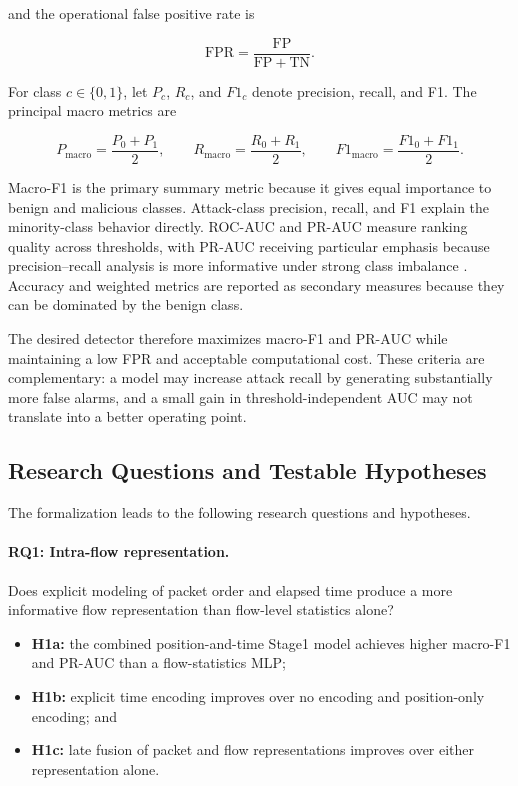 and the operational false positive rate is

\begin{equation}
\mathrm{FPR}
=
\frac{\mathrm{FP}}{\mathrm{FP}+\mathrm{TN}}.
\label{eq:fpr}
\end{equation}

For class $c\in\{0,1\}$, let $P_c$, $R_c$, and $F1_c$ denote precision,
recall, and F1. The principal macro metrics are

\begin{equation}
P_{\mathrm{macro}}=\frac{P_0+P_1}{2},
\qquad
R_{\mathrm{macro}}=\frac{R_0+R_1}{2},
\qquad
F1_{\mathrm{macro}}=\frac{F1_0+F1_1}{2}.
\label{eq:macro_metrics}
\end{equation}

Macro-F1 is the primary summary metric because it gives equal importance to
benign and malicious classes. Attack-class precision, recall, and F1 explain
the minority-class behavior directly. ROC-AUC and PR-AUC measure ranking
quality across thresholds, with PR-AUC receiving particular emphasis because
precision--recall analysis is more informative under strong class imbalance
\cite{SaitoRehmsmeier2015}. Accuracy and weighted metrics are reported as
secondary measures because they can be dominated by the benign class.

The desired detector therefore maximizes macro-F1 and PR-AUC while maintaining
a low FPR and acceptable computational cost. These criteria are complementary:
a model may increase attack recall by generating substantially more false
alarms, and a small gain in threshold-independent AUC may not translate into a
better operating point.

\subsection{Research Questions and Testable Hypotheses}
\label{subsec:pf_hypotheses}

The formalization leads to the following research questions and hypotheses.

\paragraph{RQ1: Intra-flow representation.}
Does explicit modeling of packet order and elapsed time produce a more
informative flow representation than flow-level statistics alone?

\begin{itemize}
    \item \textbf{H1a:} the combined position-and-time Stage1 model achieves
    higher macro-F1 and PR-AUC than a flow-statistics MLP;
    \item \textbf{H1b:} explicit time encoding improves over no encoding and
    position-only encoding; and
    \item \textbf{H1c:} late fusion of packet and flow representations improves
    over either representation alone.
\end{itemize}


